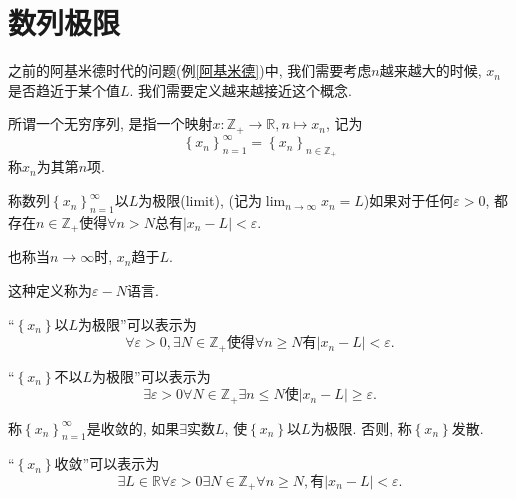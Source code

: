 
\section{数列极限}

之前的阿基米德时代的问题(例\ref{阿基米德})中, 我们需要考虑$n$越来越大的时候, $x_n$是否趋近于某个值$L$. 我们需要定义越来越接近这个概念.

\begin{definition}
    所谓一个无穷序列, 是指一个映射$x\colon \mathbb{Z}_{+} \to \mathbb{R}, n \mapsto x_n$, 记为
    \begin{equation}
      \left\{ x_n \right\} _{n=1}^{\infty} = \left\{ x_n \right\} _{n \in \mathbb{Z}_{+}}
    \end{equation}
    称$x_n$为其第$n$项.
\end{definition}

\begin{definition}
    称数列$\left\{ x_n \right\} _{n=1}^{\infty}$以$L$为极限(limit), (记为$\displaystyle \lim_{n \to \infty}x_n = L$)如果对于任何$\varepsilon> 0$, 都存在$n \in \mathbb{Z}_{+}$使得$\forall n>N$总有$|x_n - L| <\varepsilon$.

    也称当$n\to \infty$时, $x_n$趋于$L$.

    这种定义称为$\varepsilon - N$语言.
\end{definition}
``$\left\{ x_n \right\} $以$L$为极限''可以表示为
\begin{equation}
  \forall \varepsilon > 0 ,\exists N \in \mathbb{Z}_{+}\text{使得} \forall n\ge N \text{有} |x_n - L| < \varepsilon.
\end{equation}

``$\left\{ x_n \right\} $不以$L$为极限''可以表示为
\begin{equation}
  \exists \varepsilon>0  \forall N\in \mathbb{Z}_{+} \exists n \le N \text{使}|x_n-L|\ge \varepsilon.
\end{equation}

\begin{definition}
    称$\left\{ x_n \right\} _{n=1}^{\infty}$是收敛的, 如果$\exists $实数$L$, 使$\left\{ x_n \right\} $以$L$为极限.
    否则, 称$\left\{ x_n \right\} $发散.
\end{definition}

``$\left\{ x_n \right\} $收敛''可以表示为
\begin{equation}
  \exists  L \in \mathbb{R} \forall \varepsilon >0 \exists N \in \mathbb{Z}_{+} \forall n \ge  N, \text{有} |x_n-L|<\varepsilon.
\end{equation}

